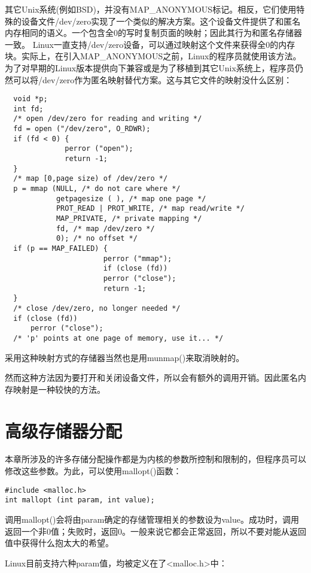 其它Unix系统(例如BSD)，并没有MAP\_ANONYMOUS标记。相反，它们使用特殊的设备文件/dev/zero实现了一个类似的解决方案。这个设备文件提供了和匿名内存相同的语义。一个包含全0的写时复制页面的映射；因此其行为和匿名存储器一致。 Linux一直支持/dev/zero设备，可以通过映射这个文件来获得全0的内存块。实际上，在引入MAP\_ANONYMOUS之前，Linux的程序员就使用该方法。为了对早期的Linux版本提供向下兼容或是为了移植到其它Unix系统上，程序员仍然可以将/dev/zero作为匿名映射替代方案。这与其它文件的映射没什么区别： 

\begin{lstlisting}
  void *p;
  int fd;
  /* open /dev/zero for reading and writing */
  fd = open ("/dev/zero", O_RDWR);
  if (fd < 0) {
              perror ("open");
              return -1;
  }
  /* map [0,page size) of /dev/zero */
  p = mmap (NULL, /* do not care where */
            getpagesize ( ), /* map one page */
            PROT_READ | PROT_WRITE, /* map read/write */
            MAP_PRIVATE, /* private mapping */
            fd, /* map /dev/zero */
            0); /* no offset */
  if (p == MAP_FAILED) {
                       perror ("mmap");
                       if (close (fd))
                       perror ("close");
                       return -1;
  }
  /* close /dev/zero, no longer needed */
  if (close (fd))
      perror ("close");
  /* 'p' points at one page of memory, use it... */ 
\end{lstlisting}

采用这种映射方式的存储器当然也是用munmap()来取消映射的。

然而这种方法因为要打开和关闭设备文件，所以会有额外的调用开销。因此匿名内存映射是一种较快的方法。 

\section{高级存储器分配}

本章所涉及的许多存储分配操作都是为内核的参数所控制和限制的，但程序员可以修改这些参数。为此，可以使用mallopt()函数： 

\begin{lstlisting}
#include <malloc.h>
int mallopt (int param, int value);
\end{lstlisting}

调用mallopt()会将由param确定的存储管理相关的参数设为value。成功时，调用返回一个非0值；失败时，返回0。一般来说它都会正常返回，所以不要对能从返回值中获得什么抱太大的希望。

Linux目前支持六种param值，均被定义在了<malloc.h>中： 


